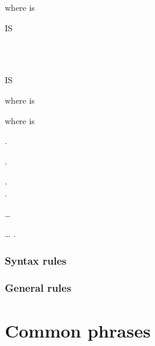 where  is

\begin{syntax}[\miscextcolour]
  \begin{0-1}
    \begin{0-1}
    \end{0-1}
     IS
    \begin{1=}
       \\
      \integer
    \end{1=} \\

     IS 
  \end{0-1}
\end{syntax}

where  is

\begin{syntax}[\miscextcolour]
\end{syntax}

where  is

\begin{syntax}
  .\newline
  \begin{0-1}
     .
    \begin{0-1}
      . \\
      \imperativestatement .
    \end{0-1} \ldots
  \end{0-1}\ldots\newline
   .
\end{syntax}

\subsubsection{Syntax rules}

\subsubsection{General rules}

\section{Common phrases}

